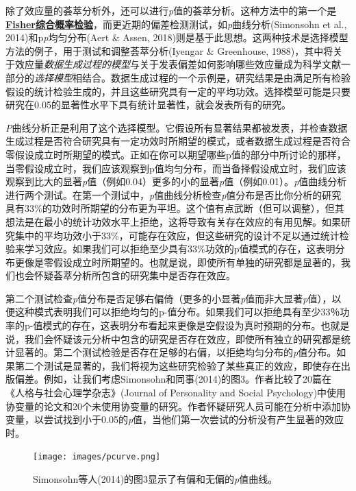 \documentclass[
  letterpaper,
  DIV=11,
  numbers=noendperiod]{scrreprt}
\begin{document}
除了效应量的荟萃分析外，还可以进行\emph{p}值的荟萃分析。这种方法中的第一个是\href{https://en.wikipedia.org/wiki/Fisher\%27s_method}{\textbf{Fisher综合概率检验}}，而更近期的偏差检测测试，如\emph{p}曲线分析(Simonsohn
et al., 2014)和p\emph{p}均匀分布(Aert \& Assen,
2018)则是基于此思想。这两种技术是选择模型方法的例子，用于测试和调整荟萃分析(Iyengar
\& Greenhouse,
1988)，其中将关于效应量\emph{数据生成过程的模型}与关于发表偏差如何影响哪些效应量成为科学文献一部分的\emph{选择模型}相结合。数据生成过程的一个示例是，研究结果是由满足所有检验假设的统计检验生成的，并且这些研究具有一定的平均功效。选择模型可能是只要研究在0.05的显著性水平下具有统计显著性，就会发表所有的研究。

\emph{P}曲线分析正是利用了这个选择模型。它假设所有显著结果都被发表，并检查数据生成过程是否符合研究具有一定功效时所期望的模式，或者数据生成过程是否符合零假设成立时所期望的模式。正如在你可以期望哪些p值的部分中所讨论的那样，当零假设成立时，我们应该观察到p值均匀分布，而当备择假设成立时，我们应该观察到比大的显著\emph{p}值（例如0.04）更多的小的显著\emph{p}值（例如0.01）。\emph{p}值曲线分析进行两个测试。在第一个测试中，\emph{p}值曲线分析检查\emph{p}值分布是否比你分析的研究具有33\%的功效时所期望的分布更为平坦。这个值有点武断（但可以调整），但其想法是在最小的统计功效水平上拒绝，这将导致有关存在效应的有用见解。如果研究集中的平均功效小于33\%，可能存在效应，但这些研究的设计不足以通过统计检验来学习效应。如果我们可以拒绝至少具有33\%功效的p值模式的存在，这表明分布更像是零假设成立时所期望的。也就是说，即使所有单独的研究都是显著的，我们也会怀疑荟萃分析所包含的研究集中是否存在效应。

第二个测试检查\emph{p}值分布是否足够右偏倚（更多的小显著\emph{p}值而非大显著\emph{p}值），以便这种模式表明我们可以拒绝均匀的p-值分布。如果我们可以拒绝具有至少33％功率的p-值模式的存在，这表明分布看起来更像是空假设为真时预期的分布。也就是说，我们会怀疑该元分析中包含的研究是否存在效应，即使所有独立的研究都是统计显著的。第二个测试检验是否存在足够的右偏，以拒绝均匀分布的\emph{p}值分布。如果第二个测试是显著的，我们将视为这些研究检验了某些真正的效应，即使存在出版偏差。例如，让我们考虑Simonsohn和同事(2014)的图3。作者比较了20篇在《人格与社会心理学杂志》(Journal
of Personality and Social
Psychology)中使用协变量的论文和20个未使用协变量的研究。作者怀疑研究人员可能在分析中添加协变量，以尝试找到小于0.05的\emph{p}值，当他们第一次尝试的分析没有产生显著的效应时。

\begin{figure}

{\centering \texttt{[image: images/pcurve.png]}

}

\caption{\label{fig-pcurve}Simonsohn等人(2014)的图3显示了有偏和无偏的\emph{p}值曲线。}

\end{figure}
\end{document}
